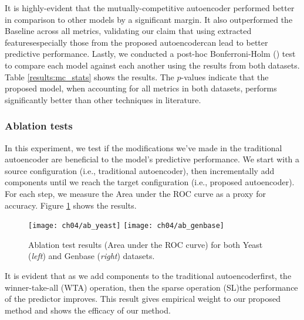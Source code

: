 


\par It is highly-evident that the mutually-competitive autoencoder performed
better in comparison to other models by a significant margin. It also
outperformed the Baseline across all metrics, validating our claim that using
extracted features\textemdash especially those from the proposed
autoencoder\textemdash can lead to better predictive performance. Lastly, we
conducted a post-hoc Bonferroni-Holm (\cite{holm1979simple}) test to compare
each model against each another using the results from both datasets. Table
\ref{results:mc_stats} shows the results. The $p$-values indicate that the
proposed model, when accounting for all metrics in both datasets, performs
significantly better than other techniques in literature.



\subsubsection{Ablation tests}

\par In this experiment, we test if the modifications we've made in the
traditional autoencoder are beneficial to the model's predictive performance.
We start with a source configuration (i.e., traditional autoencoder), then
incrementally add components until we reach the target configuration (i.e.,
proposed autoencoder). For each step, we measure the Area under the ROC curve
as a proxy for accuracy. Figure \ref{results:mc_ablation} shows the results.

\begin{figure}[t]
  \centering
  \texttt{[image: ch04/ab\_yeast]}
  \texttt{[image: ch04/ab\_genbase]}
  \caption[Ablation test results for the two protein benchmarks]{
    Ablation test results (Area under the ROC curve)
    for both Yeast (\textit{left}) and Genbase (\textit{right}) datasets.
  }
  \label{results:mc_ablation}
\end{figure}

\par It is evident that as we add components to the traditional
autoencoder\textemdash first, the winner-take-all (WTA) operation, then the
sparse operation (SL)\textemdash the performance of the predictor improves.
This result gives empirical weight to our proposed method and shows the efficacy
of our method.

